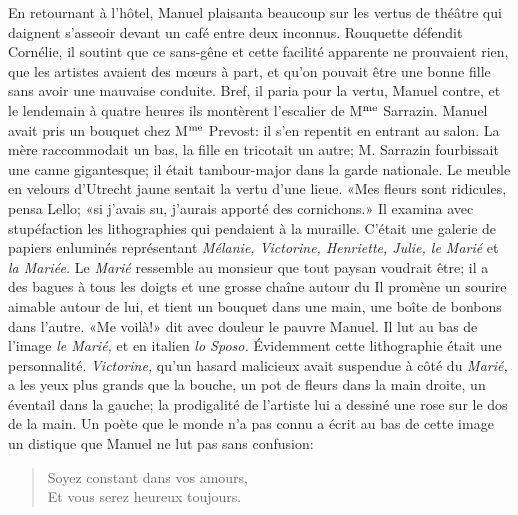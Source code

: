 En retournant à l'hôtel, Manuel plaisanta beaucoup sur les vertus de théâtre qui daignent s'asseoir devant un café entre deux inconnus. Rouquette défendit Cornélie, il soutint que ce sans-gêne et cette facilité apparente ne prouvaient rien, que les artistes avaient des m\oe{}urs à part, et qu'on pouvait être une bonne fille sans avoir une mauvaise conduite. Bref, il paria pour la vertu, Manuel contre, et le lendemain à quatre heures ils montèrent l'escalier de M$\textsuperscript{me}$ Sarrazin. Manuel avait pris un bouquet chez M$\textsuperscript{me}$ Prevost: il s'en repentit en entrant au salon. La mère raccommodait un bas, la fille en tricotait un autre; M. Sarrazin fourbissait une canne gigantesque; il était tambour-major dans la garde nationale. Le meuble en velours d'Utrecht jaune sentait la vertu d'une lieue. «Mes fleurs sont ridicules, pensa Lello; «si j'avais su, j'aurais apporté des cornichons.» Il examina avec stupéfaction les lithographies qui pendaient à la muraille. C'était une galerie de papiers enluminés représentant \emph{Mélanie, Victorine, Henriette, Julie, le Marié} et \emph{la Mariée.} Le \emph{Marié} ressemble au monsieur que tout paysan voudrait être; il a des bagues à tous les doigts et une grosse chaîne autour du Il promène un sourire aimable autour de lui, et tient un bouquet dans une main, une boîte de bonbons dans l'autre. «Me voilà!» dit avec douleur le pauvre Manuel. Il lut au bas de l'image \emph{le Marié,} et en italien \emph{lo Sposo.} Évidemment cette lithographie était une personnalité. \emph{Victorine,} qu'un hasard malicieux avait suspendue à côté du \emph{Marié,} a les yeux plus grands que la bouche, un pot de fleurs dans la main droite, un éventail dans la gauche; la prodigalité de l'artiste lui a dessiné une rose sur le dos de la main. Un poète que le monde n'a pas connu a écrit au bas de cette image un distique que Manuel ne lut pas sans confusion:

\begin{quote}
Soyez constant dans vos amours,\\
Et vous serez heureux toujours.
\end{quote}

